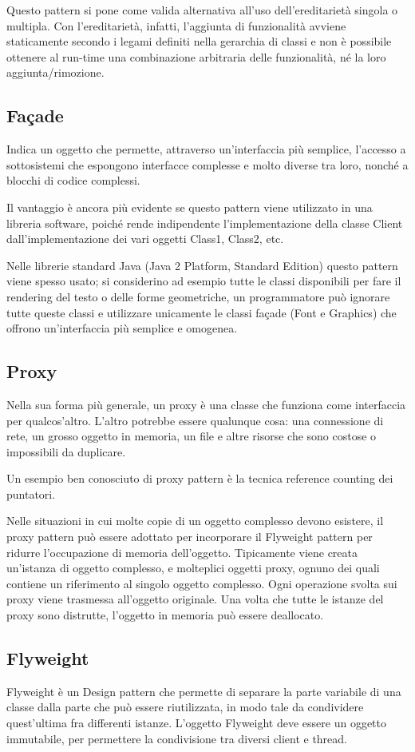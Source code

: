 Questo pattern si pone come valida alternativa all'uso dell'ereditarietà singola o multipla. Con l'ereditarietà, infatti, l'aggiunta di funzionalità avviene staticamente secondo i legami definiti nella gerarchia di classi e non è possibile ottenere al run-time una combinazione arbitraria delle funzionalità, né la loro aggiunta/rimozione.

\subsection{Façade}
Indica un oggetto che permette, attraverso un'interfaccia più semplice, l'accesso a sottosistemi che espongono interfacce complesse e molto diverse tra loro, nonché a blocchi di codice complessi.

Il vantaggio è ancora più evidente se questo pattern viene utilizzato in una libreria software, poiché rende indipendente l'implementazione della classe Client dall'implementazione dei vari oggetti Class1, Class2, etc.

Nelle librerie standard Java (Java 2 Platform, Standard Edition) questo pattern viene spesso usato; si considerino ad esempio tutte le classi disponibili per fare il rendering del testo o delle forme geometriche, un programmatore può ignorare tutte queste classi e utilizzare unicamente le classi façade (Font e Graphics) che offrono un'interfaccia più semplice e omogenea.
\subsection{Proxy}
Nella sua forma più generale, un proxy è una classe che funziona come interfaccia per qualcos'altro. L'altro potrebbe essere qualunque cosa: una connessione di rete, un grosso oggetto in memoria, un file e altre risorse che sono costose o impossibili da duplicare.

Un esempio ben conosciuto di proxy pattern è la tecnica reference counting dei puntatori.

Nelle situazioni in cui molte copie di un oggetto complesso devono esistere, il proxy pattern può essere adottato per incorporare il Flyweight pattern per ridurre l'occupazione di memoria dell'oggetto. Tipicamente viene creata un'istanza di oggetto complesso, e molteplici oggetti proxy, ognuno dei quali contiene un riferimento al singolo oggetto complesso. Ogni operazione svolta sui proxy viene trasmessa all'oggetto originale. Una volta che tutte le istanze del proxy sono distrutte, l'oggetto in memoria può essere deallocato.
\subsection{Flyweight}
Flyweight è un Design pattern che permette di separare la parte variabile di una classe dalla parte che può essere riutilizzata, in modo tale da condividere quest'ultima fra differenti istanze. L'oggetto Flyweight deve essere un oggetto immutabile, per permettere la condivisione tra diversi client e thread.\\


